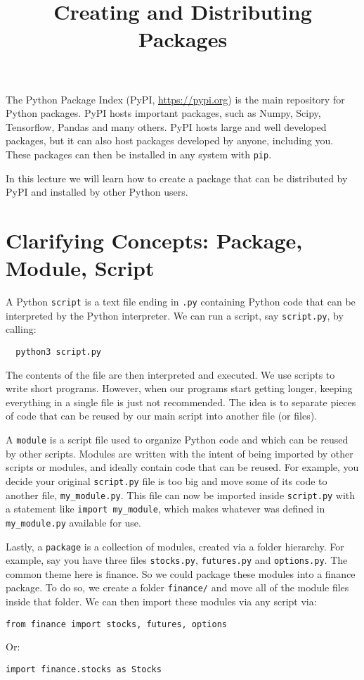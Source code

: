 \documentclass[12pt, a4paper]{article}
\date{}
\title{Creating and Distributing Packages}
\begin{document}
\maketitle
The Python Package Index (PyPI, \url{https://pypi.org}) is the main repository for Python packages.
PyPI hosts important packages, such as Numpy, Scipy, Tensorflow, Pandas and many others.
PyPI hosts large and well developed packages, but it can also host packages developed by anyone, including you.
These packages can then be installed in any system with \texttt{pip}.

In this lecture we will learn how to create a package that can be distributed by PyPI and installed by other Python users.
\section*{Clarifying Concepts: Package, Module, Script}
\label{sec:org7bb8de0}
A Python \texttt{script} is a text file ending in \texttt{.py} containing Python code that can be interpreted by the Python interpreter.
We can run a script, say \texttt{script.py}, by calling:
\lstset{language=bash,label= ,caption= ,captionpos=b,firstnumber=1,numbers=left}
\begin{lstlisting}
  python3 script.py
\end{lstlisting}
The contents of the file are then interpreted and executed.
We use scripts to write short programs.
However, when our programs start getting longer, keeping everything in a single file is just not recommended.
The idea is to separate pieces of code that can be reused by our main script into another file (or files).

A \texttt{module} is a script file used to organize Python code and which can be reused by other scripts.
Modules are written with the intent of being imported by other scripts or modules, and ideally contain code that can be reused.
For example, you decide your original \texttt{script.py} file is too big and move some of its code to another file, \texttt{my\_module.py}.
This file can now be imported inside \texttt{script.py} with a statement like \texttt{import my\_module}, which makes whatever was defined in \texttt{my\_module.py} available for use.

Lastly, a \texttt{package} is a collection of modules, created via a folder hierarchy.
For example, say you have three files \texttt{stocks.py}, \texttt{futures.py} and \texttt{options.py}.
The common theme here is finance.
So we could package these modules into a finance package.
To do so, we create a folder \texttt{finance/} and move all of the module files inside that folder.
We can then import these modules via any script via:
\lstset{language=jupyter-python,label= ,caption= ,captionpos=b,numbers=none}
\begin{lstlisting}
from finance import stocks, futures, options
\end{lstlisting}
Or:
\lstset{language=jupyter-python,label= ,caption= ,captionpos=b,numbers=none}
\begin{lstlisting}
import finance.stocks as Stocks
\end{lstlisting}
\end{document}
